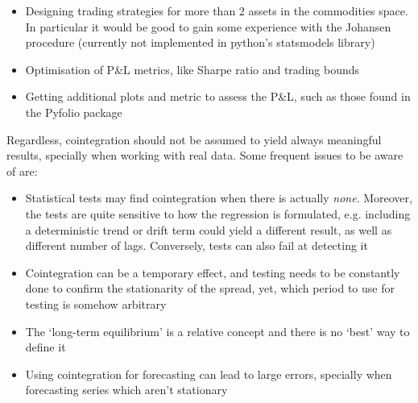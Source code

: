 \documentclass[11pt]{article}
\providecommand{\tightlist}{%
      \setlength{\itemsep}{0pt}\setlength{\parskip}{0pt}}
\begin{document}
\begin{itemize}
\tightlist

\item Designing trading strategies  for more than 2 assets in the commodities space. In particular it would be good to gain some experience with the Johansen procedure (currently not implemented in python's statsmodels library)

\item Optimisation of P\&L metrics, like Sharpe ratio and trading bounds

\item Getting additional plots and metric to assess the P\&L, such as those found in the Pyfolio package~\cite{pyfolio}


\end{itemize}     
 Regardless, cointegration should not be assumed to yield always meaningful results, specially when working with real data. Some frequent issues to be aware of are:
   
      
\begin{itemize}
\tightlist
\item Statistical tests may find cointegration when there is actually {\em none}. Moreover, the tests are quite sensitive to how the  regression  is formulated, e.g. including a deterministic trend or drift term could yield a different result, as well as different number of lags. Conversely, tests can also fail at detecting it
\item Cointegration can be a temporary effect, and testing needs to be constantly done to confirm the stationarity of the spread, yet, which period to use for testing is somehow arbitrary
\item The `long-term equilibrium' is a relative concept and there is no `best' way to define it
\item Using cointegration for forecasting can lead to large errors, specially when forecasting series which aren't stationary
\end{itemize}


    
\newpage
\end{document}
